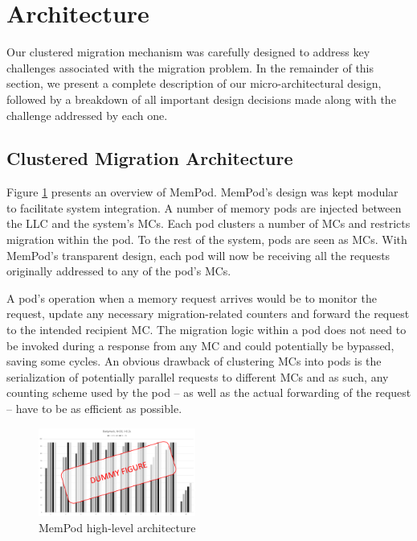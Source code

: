 \section{Architecture}
\label{sec:Architecture}

Our clustered migration mechanism was carefully designed to address key challenges associated with the migration problem. In the remainder of this section, we present a complete description of our micro-architectural design, followed by a breakdown of all important design decisions made along with the challenge addressed by each one.

\subsection{Clustered Migration Architecture}

 Figure \ref{fig:architecture_complete} presents an overview of MemPod. MemPod's design was kept modular to facilitate system integration. A number of memory pods are injected between the LLC and the system's MCs. Each pod clusters a number of MCs and restricts migration  within the pod. To the rest of the system, pods are seen as MCs. With MemPod's transparent design, each pod will now be receiving all the requests originally addressed to any of the pod's MCs. 

A pod's operation when a memory request arrives would be to monitor the request, update any necessary migration-related counters and forward the request to the intended recipient MC. The migration logic within a pod does not need to be invoked during a response from any MC and could potentially be bypassed, saving some cycles. An obvious drawback of clustering MCs into pods is the serialization of potentially parallel requests to different MCs and as such, any counting scheme used by the pod -- as well as the actual forwarding of the request -- have to be as efficient as possible. 

\begin{figure}[h]
  \includegraphics[width=0.46\textwidth]{figures/dummy.pdf}
  \caption{MemPod high-level architecture}
  \label{fig:architecture_complete}
\end{figure}

